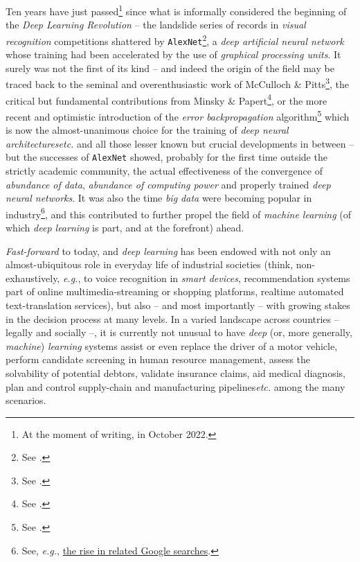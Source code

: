 

Ten years have just passed\footnote{At the moment of writing, in October 2022.} since what is informally considered the beginning of the \textit{Deep Learning Revolution} -- the landslide series of records in \textit{visual recognition} competitions shattered by \texttt{AlexNet}\footnote{See \cite{KrizhevskyEtAl2012AlexNet}.}, a \textit{deep artificial neural network} whose training had been accelerated by the use of \textit{graphical processing units}. It surely was not the first of its kind -- and indeed the origin of the field may be traced back to the seminal and overenthusiastic work of McCulloch \& Pitts\footnote{See \cite{McCullochPitts1990ALC}.}, the critical but fundamental contributions from Minsky \& Papert\footnote{See \cite{MinskyPapert1969Perceptrons}.}, or the more recent and optimistic introduction of the \textit{error backpropagation} algorithm\footnote{See \cite{RumelhartEtAl1986LearningRB}.} which is now the almost-unanimous choice for the training of \textit{deep neural architectures}\textit{etc.} and all those lesser known but crucial developments in between -- but the successes of \texttt{AlexNet} showed, probably for the first time outside the strictly academic community, the actual effectiveness of the convergence of \textit{abundance of data}, \textit{abundance of computing power} and properly trained \textit{deep neural networks}. It was also the time \textit{big data} were becoming popular in industry\footnote{See, \textit{e.g.}, \href{https://trends.google.com/trends/explore?date=all\&q=big\%20data,Deep\%20learning}{the rise in related Google searches}.}, and this contributed to further propel the field of \textit{machine learning} (of which \textit{deep learning} is part, and at the forefront) ahead.

\textit{Fast-forward} to today, and \textit{deep learning} has been endowed with not only an almost-ubiquitous role in everyday life of industrial societies (think, non-exhaustively, \textit{e.g.}, to voice recognition in \textit{smart devices}, recommendation systems part of online multimedia-streaming or shopping platforms, realtime automated text-translation services), but also -- and most importantly -- with growing stakes in the decision process at many levels. In a varied landscape across countries -- legally and socially --, it is currently not unusual to have \textit{deep} (or, more generally, \textit{machine}) \textit{learning} systems assist or even replace the driver of a motor vehicle, perform candidate screening in human resource management, assess the solvability of potential debtors, validate insurance claims, aid medical diagnosis, plan and control supply-chain and manufacturing pipelines\textit{etc.} among the many scenarios.

